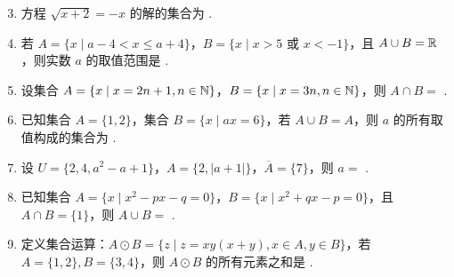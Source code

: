 \documentclass[a4paper,11pt]{article}
\begin{document}


\begin{enumerate}
\setcounter{enumi}{2}

\item 方程 $\sqrt{x+2}=-x$ 的解的集合为 \blankline[4.4em].

\ifanswer
\solbegin
{}
\solend

\fi

\item 若 $A=\{x\mid a-4<x\leqslant a+4\}$，$B=\{x\mid x>5\text{ 或 }x<-1\}$，且 $A\cup B=\mathbb{R}$，则实数 $a$ 的取值范围是 \blankline[3.6em].

\ans{$[1,3)$}

\item 设集合 $A=\{x\mid x=2n+1,n\in\mathbb{N}\}$，$B=\{x\mid x=3n,n\in\mathbb{N}\}$，则 $A\cap B=$ \blankline[4.4em].


\item 已知集合 $A=\{1,2\}$，集合 $B=\{x\mid ax=6\}$，若 $A\cup B=A$，则 $a$ 的所有取值构成的集合为 \blankline[4.4em].

\ifanswer
\solbegin
{}
\solend

\fi

\item 设 $U=\{2,4,a^2-a+1\}$，$A=\{2,|a+1|\}$，$\overline{A}=\{7\}$，则 $a=$ \blankline[2.4em].


\item 已知集合 $A=\{x\mid x^2-px-q=0\}$，$B=\{x\mid x^2+qx-p=0\}$，且 $A\cap B=\{1\}$，则 $A\cup B=$ \blankline[4.4em].


\item 定义集合运算：$A\odot B=\{z\mid z=xy(x+y),x\in A,y\in B\}$，若 $A=\{1,2\},B=\{3,4\}$，则 $A\odot B$ 的所有元素之和是 \blankline[3.6em].


\end{enumerate}
\end{document}
